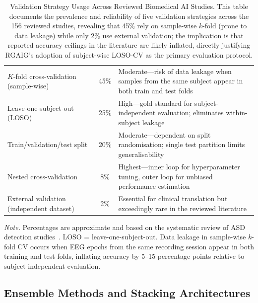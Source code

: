 \begin{table}[H]
\tablefontsize
\tablestripes\tablefontsize
\caption[Validation Strategy Usage Across Reviewed Biomedical AI]{Validation Strategy Usage Across Reviewed Biomedical AI Studies. This table documents the prevalence and reliability of five validation strategies across the 156 reviewed studies, revealing that 45\% rely on sample-wise $k$-fold (prone to data leakage) while only 2\% use external validation; the implication is that reported accuracy ceilings in the literature are likely inflated, directly justifying RGAIG's adoption of subject-wise LOSO-CV as the primary evaluation protocol.}
\begin{tabularx}{\textwidth}{@{} L c L @{}}
\toprule
{} &  &  \\
\midrule
$K$-fold cross-validation (sample-wise) & 45\% & Moderate---risk of data leakage when samples from the same subject appear in both train and test folds \\
\addlinespace
Leave-one-subject-out (LOSO) & 25\% & High---gold standard for subject-independent evaluation; eliminates within-subject leakage \\
\addlinespace
Train/validation/test split & 20\% & Moderate---dependent on split randomisation; single test partition limits generalisability \\
\addlinespace
Nested cross-validation & 8\% & Highest---inner loop for hyperparameter tuning, outer loop for unbiased performance estimation \\
\addlinespace
External validation (independent dataset) & 2\% & Essential for clinical translation but exceedingly rare in the reviewed literature \\
\bottomrule
\end{tabularx}
\vspace{0.5em}\noindent\textit{Note.} Percentages are approximate and based on the systematic review of ASD detection studies~\cite{asthana2025asd}. LOSO = leave-one-subject-out. Data leakage in sample-wise $k$-fold CV occurs when EEG epochs from the same recording session appear in both training and test folds, inflating accuracy by 5--15 percentage points relative to subject-independent evaluation.
\end{table}

\iffalse %
\subsection{Ensemble Methods and Stacking Architectures}

